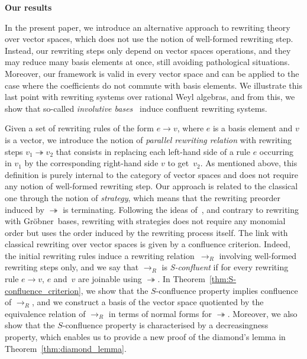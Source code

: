 \documentclass[11pt]{article}
\theoremstyle{definition}
\newcommand\G{Gröbner}
\newcommand\rewR{\to_R}
\newcommand\parRew{\twoheadrightarrow}
\begin{document}
\begin{center}
  {\large\bf Our results}
\end{center}

In the present paper, we introduce an alternative approach to rewriting theory
over vector spaces, which does not use the notion of well-formed rewriting
step. Instead, our rewriting steps only depend on vector spaces operations, and they
may reduce many basis elements at once, still avoiding pathological
situations. Moreover, our framework is valid in every vector space and can be
applied to the case where the coefficients do not commute with basis
elements. We illustrate this last point with rewriting systems over rational
Weyl algebras, and from this, we show that so-called {\em involutive
  bases}~\cite{MR1627129} induce confluent rewriting systems.  \medskip

Given a set of rewriting rules of the form $e\to v$, where $e$ is a basis element
and $v$ is a vector, we introduce the notion of {\em parallel rewriting
  relation} with rewriting steps $v_1\parRew v_2$ that consists in replacing
each left-hand side of a rule $e$ occurring in $v_1$ by the corresponding
right-hand side $v$ to get~$v_2$. As mentioned above, this definition is purely
internal to the category of vector spaces and does not require any notion of
well-formed rewriting step. Our approach is related to the classical one through
the notion of {\em strategy}, which means that the rewriting preorder induced by
$\parRew$ is terminating. Following the ideas of~\cite{GuiraudHoffbeckMalbos19},
and contrary to rewriting with \G\ bases, rewriting with strategies does not
require any monomial order but uses the order induced by the rewriting process
itself. The link with classical rewriting over vector spaces is given by a
confluence criterion. Indeed, the initial rewriting rules induce a rewriting
relation~$\rewR$ involving well-formed rewriting steps only, and we say that
$\rewR$ is {\em S-confluent} if for every rewriting rule $e\to v$, $e$ and~$v$ are
joinable using $\parRew$. In Theorem~\ref{thm:S-confluence_criterion}, we show
that the $S$-confluence property implies confluence of $\rewR$, and we construct
a basis of the vector space quotiented by the equivalence relation of $\rewR$ in
terms of normal forms for $\parRew$. Moreover, we also show that the
$S$-confluence property is characterised by a decreasingness property, which
enables us to provide a new proof of the diamond's lemma in
Theorem~\ref{thm:diamond_lemma}.  \medskip
\end{document}
